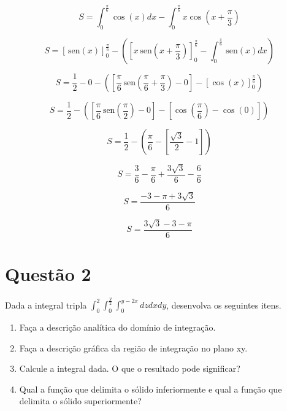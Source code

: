 \documentclass[10pt,a4paper]{article}
\newcommand{\sen}{\hspace{2pt}\textrm{sen}}
\begin{document}
	\begin{equation*}
		S = \int_0^{\frac{\pi}{6}} \cos (x) dx - \int_0^{\frac{\pi}{6}} x \cos \left( x + \frac{\pi}{3}\right)
	\end{equation*}

	\begin{equation*}
		S = \left[ \sen (x) \right]_0^{\frac{\pi}{6}} -
		\left( \left[x \sen \left(x + \frac{\pi}{3}\right)\right]_0^{\frac{\pi}{6}} - \int_{0}^{\frac{\pi}{6}} \sen (x) dx \right)
	\end{equation*}
	
	\begin{equation*}
		S = \frac{1}{2} - 0 -
		\left( \left[ \frac{\pi}{6} \sen \left( \frac{\pi}{6} + \frac{\pi}{3} \right) - 0 \right] - \left[ \cos (x) \right]_0^{\frac{\pi}{6}} \right)
	\end{equation*}
	
	\begin{equation*}
		S = \frac{1}{2} - \left( \left[ \frac{\pi}{6} \sen \left( \frac{\pi}{2} \right) - 0 \right] - \left[ \cos \left(\frac{\pi}{6}\right) - \cos \left( 0 \right) \right] \right)
	\end{equation*}
	
	\begin{equation*}
		S = \frac{1}{2} - \left( \frac{\pi}{6} - \left[ \frac{\sqrt{3}}{2} - 1 \right] \right)
	\end{equation*}
	
	\begin{equation*}
		S = \frac{3}{6} - \frac{\pi}{6} + \frac{3\sqrt{3}}{6} - \frac{6}{6}
	\end{equation*}
	
	\begin{equation*}
		S = \frac{-3-\pi+3\sqrt{3}}{6}
	\end{equation*}
	
	\begin{equation*}
		S = \frac{3\sqrt{3}-3-\pi}{6}
	\end{equation*}
	
	\section*{Questão 2}
	
	Dada a integral tripla $ \int_{0}^{2} \int_{0}^{\frac{y}{2}} \int_{0}^{y-2x} dz dx dy $, desenvolva os seguintes itens.
	
	\begin{enumerate}[a]
		\item Faça a descrição analítica do domínio de integração.
		\item Faça a descrição gráfica da região de integração no plano xy.
		\item Calcule a integral dada. O que o resultado pode significar?
		\item Qual a função que delimita o sólido inferiormente e qual a função que delimita o sólido superiormente?
	\end{enumerate}
	
\end{document}
